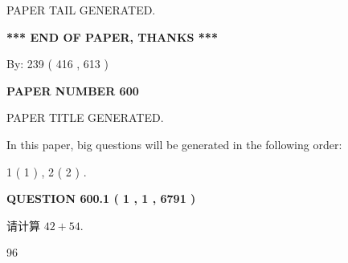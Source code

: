 \documentclass{ctexart}
\begin{document}
\vspace{2.0in} PAPER TAIL GENERATED.
   
   
   
   
\vspace{1.0in} 
{\textbf{\large{ *** END OF PAPER, THANKS *** }}} 
   
   
\hspace{1.0in} By: 
 239 ( 416 ,  613 )
   
   
   
   
\newpage 
\setcounter{page}{ 
   600001 } 
   
   
   
   
 {\textbf{ \Large{ PAPER NUMBER  600  }}}
   
   
\vspace{0.2in}
   
   
   
   
   
   
   
   
 \vspace{0.2in}
 
 
 
 
   
   
 PAPER TITLE GENERATED.
   
   
   
\vspace{0.2in}
   
In this paper, big questions will be generated in the following order: 
   
   
   1 ( 1 )
 ,
   2 ( 2 )
 .
  
\vspace{0.2in}
  
{\textbf{\Large{QUESTION
600.1 
 ( 1 , 1 , 6791 )
}}}
  
  
 
请计算 $ %
42 +  %
54 $.
 
 
 
\noindent{}
 
 

96
 
 
\noindent{}
 
 

 
 
 
\noindent{}
 
\end{document}
